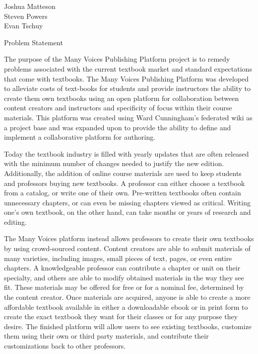 \documentclass[letterpaper, 10pt, draftclsnofoot, onecolumn]{IEEEtran}
\begin{document}
    \setlength{\parindent}{0pt}
    \setlength{\parskip}{0pt}
\begingroup\flushleft
  Joshua Matteson\\
  Steven Powers\\
  Evan Tschuy
\endgroup

\setlength{\parindent}{4em}
\linespread{1.1}

\vspace{1pc}
\centerline{\sc \large Problem Statement}
\vspace{2pc}

The purpose of the Many Voices Publishing Platform project is to remedy problems 
associated with the current textbook market and standard expectations that come 
with textbooks. The Many Voices Publishing Platform was developed to alleviate 
costs of text-books for students and provide instructors the ability 
to create them own textbooks using an open platform for collaboration between 
content creators and instructors and specificity of focus within their course materials. 
This platform was created using Ward Cunningham’s federated wiki as a project 
base and was expanded upon to provide the ability to define and implement a 
collaborative platform for authoring.

Today the textbook industry is filled with yearly updates that are often released with the
minimum number of changes needed to justify the new edition. Additionally, the addition of 
online course materials are used to keep students and professors buying new textbooks. 
A professor can either choose a textbook from a catalog, or write one of their own. 
Pre-written textbooks often contain unnecessary chapters, or can even be missing chapters 
viewed as critical. Writing one's own textbook, on the other hand, can take months or 
years of research and editing.

The Many Voices platform instead allows professors to create their own textbooks 
by using crowd-sourced content. Content creators are able to submit materials of 
many varieties, including images, small pieces of text, pages, or even entire chapters. 
A knowledgeable professor can contribute a chapter or unit on their specialty, and 
others are able to modify obtained materials in the way they see fit. These materials may be
offered for free or for a nominal fee, determined by the content creator. Once materials are 
acquired, anyone is able to create a more affordable textbook available in either
a downloadable ebook or in print form to create the exact textbook they want for their classes
or for any purpose they desire. The finished platform will allow users to see existing 
textbooks, customize them using their own or third party materials, and contribute their 
customizations back to other professors.
\end{document}

